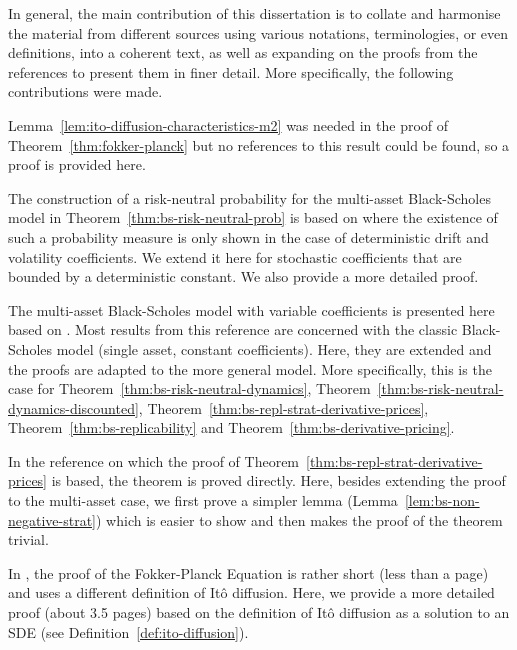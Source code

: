 \documentclass[english]{article}
\newcommand{\comment}[1]{\color{blue}#1\color{black}}
\numberwithin{equation}{section}
\numberwithin{figure}{section}
\theoremstyle{bolddescit}
\theoremstyle{definition}
\theoremstyle{definition}
\theoremstyle{plain}
\theoremstyle{plain}
\theoremstyle{bolddesc}
\theoremstyle{plain}
\theoremstyle{remark}
\begin{document}
In general, the main contribution of this dissertation is to collate and harmonise the material from different sources using various notations, terminologies, or even definitions, into a coherent text, as well as expanding on the proofs from the references to present them in finer detail. More specifically, the following contributions were made.

Lemma~\ref{lem:ito-diffusion-characteristics-m2} was needed in the proof of Theorem~\ref{thm:fokker-planck} but no references to this result could be found, so a proof is provided here.

The construction of a risk-neutral probability for the multi-asset Black-Scholes model in Theorem~\ref{thm:bs-risk-neutral-prob} is based on \textcite{capinski_blackscholes_2012} where the existence of such a probability measure is only shown in the case of deterministic drift and volatility coefficients. We extend it here for stochastic coefficients that are bounded by a deterministic constant. We also provide a more detailed proof.

The multi-asset Black-Scholes model with variable coefficients is presented here based on \textcite{capinski_blackscholes_2012}. Most results from this reference are concerned with the classic Black-Scholes model (single asset, constant coefficients). Here, they are extended and the proofs are adapted to the more general model. More specifically, this is the case for Theorem~\ref{thm:bs-risk-neutral-dynamics}, Theorem~\ref{thm:bs-risk-neutral-dynamics-discounted}, Theorem~\ref{thm:bs-repl-strat-derivative-prices}, Theorem~\ref{thm:bs-replicability} and Theorem~\ref{thm:bs-derivative-pricing}.

In the reference on which the proof of Theorem~\ref{thm:bs-repl-strat-derivative-prices} is based, the theorem is proved directly. Here, besides extending the proof to the multi-asset case, we first prove a simpler lemma (Lemma~\ref{lem:bs-non-negative-strat}) which is easier to show and then makes the proof of the theorem trivial.

In \textcite{pavliotis_stochastic_2014}, the proof of the Fokker-Planck Equation is rather short (less than a page) and uses a different definition of It\^o diffusion. Here, we provide a more detailed proof (about 3.5 pages) based on the definition of It\^o diffusion as a solution to an SDE (see Definition~\ref{def:ito-diffusion}).
\end{document}
